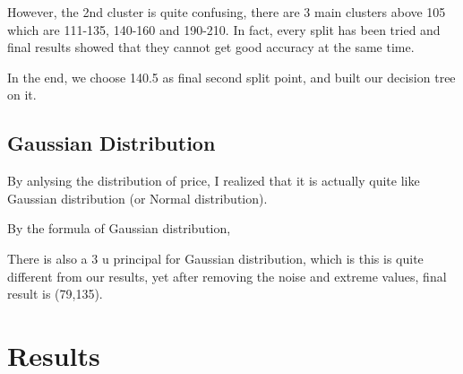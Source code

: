 \documentclass{sig-alternate}
\begin{document}
	However, the 2nd cluster is quite confusing, there are 3 main clusters above 105 which are 111-135, 140-160 and 190-210. In fact,
	every split has been tried and final results showed that they cannot get good accuracy at the same time.


	In the end, we choose 140.5 as final second split point, and built our decision tree on it.

	\subsection{Gaussian Distribution}
	
	By anlysing the distribution of price, I realized that it is actually quite like Gaussian distribution (or Normal distribution). 
	
	By the formula of Gaussian distribution, 


	There is also a 3 u principal for Gaussian distribution, which is
	this is quite different from our results, yet after removing the noise and extreme values, final result is (79,135). 


	\section{Results}
\end{document}
